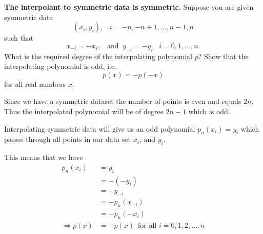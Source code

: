 \textbf{The interpolant to symmetric data is symmetric.} Suppose you
are given symmetric data \[(x_i, y_i), \;\;\; i= -n, -n+1, \dots, n-1,
n\] such that \[x_{-i} = -x_i, \;\;\; \text{and} \;\; y_{-i} = -y_i
\;\;\; i=0,1,\dots,n.\]
What is the required degree of the interpolating polynomial $p$? Show
that the interpolating polynomial is odd, i.e. \[p(x) = -p(-x)\] for
all real numbers $x$.

{\color{blue}

Since we have a symmetric dataset the number of points is even and
equals $2n$. Thus the interpolated polynomial will be of degree $2n -
1$ which is odd.

Interpolating symmetric data will give us an odd polynomial $p_n(x_i) =
y_i$ which passes through all points in our data set $x_i$, and $y_i$.

This means that we have
\begin{align*}
p_n(x_i) &= y_i \\
          &= -(-y_i) \\
          &= -y_{-i} \\
          &= - p_n(x_{-i}) \\
          &= - p_n(-x_i) \\
\Rightarrow p(x) &= -p(x) \,\,\, \text{for all } i = 0,1,2,\dots,n
\end{align*}


}
